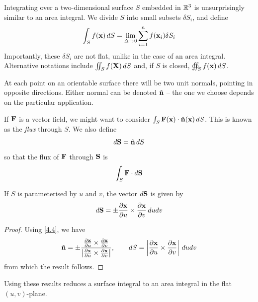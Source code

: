\documentclass{../../template/note}
\begin{document}
    Integrating over a two-dimensional surface \(S\) embedded in \(\mathbb R^3\) is unsurprisingly similar to an area integral. We divide \(S\) into small subsets \(\delta S_i\), and define
    \begin{align*}
        \int_S f(\V x) \D S = \lim_{\Delta \to 0} \sum_{i=1}^n f(\V x_i) \delta S_i
    \end{align*}
    Importantly, these \(\delta S_i\) are not flat, unlike in the case of an area integral. Alternative notations include \(\iint_S f(\V X) \D S\) and, if \(S\) is closed, \(\oiint_S f(\V x) \D S\).

    At each point on an orientable surface there will be two unit normals, pointing in opposite directions. Either normal can be denoted \(\hvec n\) -- the one we choose depends on the particular application.

    If \(\V F\) is a vector field, we might want to consider \(\int_S \V F(\V x) \cdot \hvec n(\V x) \D S\). This is known as the \emph{flux} through \(S\). We also define
    \begin{align*}
        d \V S = \hvec n \D S
    \end{align*}
    so that the flux of \(\V F\) through \(\V S\) is
    \begin{align*}
        \int_S \V F \cdot d \V S
    \end{align*}

    \begin{proposition}
        If \(S\) is parameterised by \(u\) and \(v\), the vector \(d \V S\) is given by
        \begin{align*}
            d \V S = \pm \pd{\V x}u \times \pd{\V x}v \D u dv
        \end{align*}
    \end{proposition}
    
    \begin{proof}
        Using \cref{4.4}, we have
        \begin{align*}
            \hvec n = \pm \frac{\pd{\V x}u \times \pd{\V x}v}{\left|\pd{\V x}u \times \pd{\V x}v\right|}, \qquad dS = \left|\pd{\V x}u \times \pd{\V x}v\right|\D u dv
        \end{align*}
        from which the result follows.
    \end{proof}
    
    Using these results reduces a surface integral to an area integral in the flat \((u, v)\)-plane.
    
\end{document}
